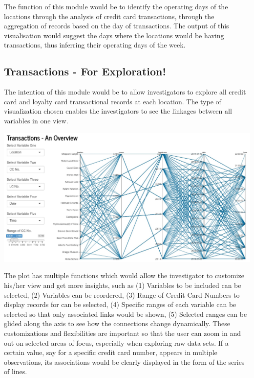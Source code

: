 \documentclass{acm_proc_article-sp}
\begin{document}
The function of this module would be to identify the operating days of
the locations through the analysis of credit card transactions, through
the aggregation of records based on the day of transactions. The output
of this visualisation would suggest the days where the locations would
be having transactions, thus inferring their operating days of the week.

\hypertarget{transactions---for-exploration}{%
\subsection{Transactions - For
Exploration!}\label{transactions---for-exploration}}

The intention of this module would be to allow investigators to explore
all credit card and loyalty card transactional records at each location.
The type of visualization chosen enables the investigators to see the
linkages between all variables in one view.

\includegraphics{img/P01Para.jpg}

The plot has multiple functions which would allow the investigator to
customize his/her view and get more insights, such as (1) Variables to
be included can be selected, (2) Variables can be reordered, (3) Range
of Credit Card Numbers to display records for can be selected, (4)
Specific ranges of each variable can be selected so that only associated
links would be shown, (5) Selected ranges can be glided along the axis
to see how the connections change dynamically. These customizations and
flexibilities are important so that the user can zoom in and out on
selected areas of focus, especially when exploring raw data sets. If a
certain value, say for a specific credit card number, appears in
multiple observations, its associations would be clearly displayed in
the form of the series of lines.
\end{document}
